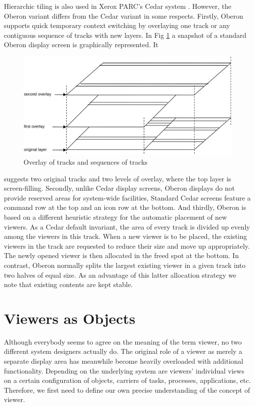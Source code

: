 Hierarchic tiling is also used in Xerox PARC's Cedar system \cite{Teitelman}. However, the Oberon
variant differs from the Cedar variant in some respects. Firstly, Oberon supports quick temporary
context switching by overlaying one track or any contiguous sequence of tracks with new layers.
In Fig \ref{fig:overlay} a snapshot of a standard Oberon display screen is graphically represented. It
\begin{figure}
	\centering
	\includegraphics[width=\textwidth]{i/6}
	\caption{Overlay of tracks and sequences of tracks}
	\label{fig:overlay}
\end{figure}
suggests two original tracks and two levels of overlay, where the top layer is screen-filling.
Secondly, unlike Cedar display screens, Oberon displays do not provide reserved areas for
system-wide facilities, Standard Cedar screens feature a command row at the top and an icon row
at the bottom. And thirdly, Oberon is based on a different heuristic strategy for the automatic
placement of new viewers. As a Cedar default invariant, the area of every track is divided up
evenly among the viewers in this track. When a new viewer is to be placed, the existing viewers in
the track are requested to reduce their size and move up appropriately. The newly opened viewer
is then allocated in the freed spot at the bottom. In contrast, Oberon normally splits the largest
existing viewer in a given track into two halves of equal size. As an advantage of this latter
allocation strategy we note that existing contents are kept stable.

\section{Viewers as Objects}
Although everybody seems to agree on the meaning of the term viewer, no two different system
designers actually do. The original role of a viewer as merely a separate display area has
meanwhile become heavily overloaded with additional functionality. Depending on the underlying
system are viewers' individual views on a certain configuration of objects, carriers of tasks,
processes, applications, etc. Therefore, we first need to define our own precise understanding of
the concept of viewer.

